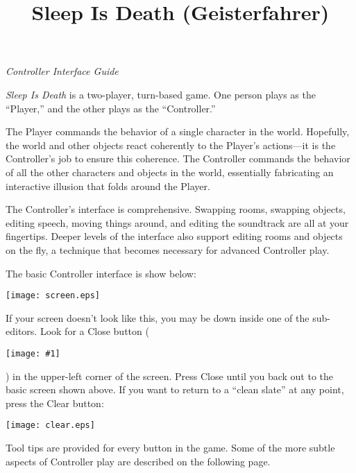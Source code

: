 \documentclass[12pt]{article}
\newcommand{\buttonFig}[1]{
\parbox[c]{1em}{\vspace{0em} \texttt{[image: \#1]} }
}
\begin{document}
\title{Sleep Is Death (Geisterfahrer)}

\date{}

\maketitle


\vspace{-0.9in}

\begin{center}
{\Large \it Controller Interface Guide}
\end{center}


{\it Sleep Is Death} is a two-player, turn-based game.  One person plays as the ``Player,'' and the other plays as the ``Controller.''

The Player commands the behavior of a single character in the world.  Hopefully, the world and other objects react coherently to the Player's actions---it is the Controller's job to ensure this coherence.  The Controller commands the behavior of all the other characters and objects in the world, essentially fabricating an interactive illusion that folds around the Player.


The Controller's interface is comprehensive.  Swapping rooms, swapping objects, editing speech, moving things around, and editing the soundtrack are all at your fingertips.  Deeper levels of the interface also support editing rooms and objects on the fly, a technique that becomes necessary for advanced Controller play.

The basic Controller interface is show below:
\begin{center}
\texttt{[image: screen.eps]}
\end{center}
If your screen doesn't look like this, you may be down inside one of the sub-editors.  Look for a Close button (\buttonFig{close.eps}) in the upper-left corner of the screen.  Press Close until you back out to the basic screen shown above.  If you want to return to a ``clean slate'' at any point, press the Clear button:
\begin{center}
\texttt{[image: clear.eps]}
\end{center}
Tool tips are provided for every button in the game.  Some of the more subtle aspects of Controller play are described on the following page.
\end{document}
